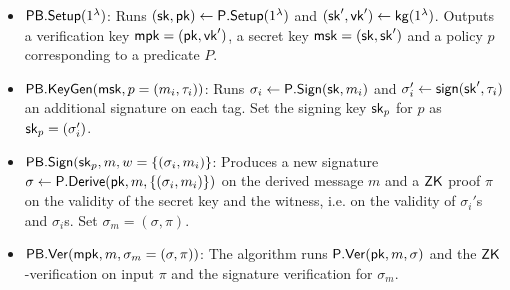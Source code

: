 \documentclass[11pt]{llncs}
\begin{document}
\begin{itemize}


\item ${\sf PB.Setup}(1^\lambda)$: Runs $({\sf sk}, {\sf pk}) \gets {\sf P.Setup}(1^\lambda)$ and $({\sf sk}', {\sf vk}') \gets {\sf kg}(1^{\lambda})$.  Outputs a verification key ${\sf mpk}=({\sf pk}, {\sf vk}')$, a secret key ${\sf msk}=({\sf sk}, {\sf sk}')$ and a policy $p$ 
corresponding to a predicate $P$.


\item ${\sf PB.KeyGen}({\sf msk}, p=(m_i, \tau_i))$: Runs $\sigma_i \gets {\sf P.Sign}({\sf sk}, m_i)$ and $\sigma'_i \gets {\sf sign}({\sf sk}', \tau_i)$ an additional signature on each tag. Set the signing key ${\sf sk}_p$ for $p$ as ${\sf sk}_p=(\sigma'_i)$.

\item ${\sf PB.Sign}({\sf sk}_p, m, w= \lbrace (\sigma_i, m_i) \rbrace$: Produces a new signature $\sigma \gets {\sf P.Derive}({\sf pk}, m, \lbrace (\sigma_i, m_i) \rbrace)$ on the derived message $m$ and a ${\sf ZK}$ proof $\pi$ on the validity of the secret key and the witness, i.e. on the validity of $\sigma_i'$s and $\sigma_i$s. Set $\sigma_m=(\sigma, \pi)$.


\item ${\sf PB.Ver}({\sf mpk},  m, \sigma_m = (\sigma, \pi))$: The algorithm runs ${\sf P.Ver}({\sf pk}, m, \sigma)$ and the ${\sf ZK}$-verification on input $\pi$ and the signature verification for $\sigma_m$.


\end{itemize}

 

%
%
\end{document}

